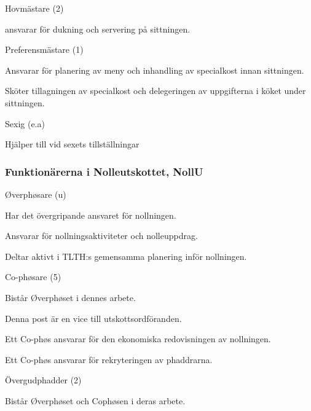 \documentclass[10pt]{article}
\begin{document}
\begin{emptylist}
    \item Hovmästare (2)
        \begin{dashlist}
        \item ansvarar för dukning och servering på sittningen.
        \end{dashlist}
    \item Preferensmästare (1)
        \begin{dashlist}
        \item Ansvarar för planering av meny och inhandling av specialkost innan sittningen.
        \item Sköter tillagningen av specialkost och delegeringen av uppgifterna i köket under sittningen.
        \end{dashlist}
    \item Sexig (e.a)
        \begin{dashlist}
        \item Hjälper till vid sexets tillställningar
        \end{dashlist}

\end{emptylist}
\subsubsection{Funktionärerna i Nolleutskottet, NollU}

\begin{emptylist}
    \item Øverphøsare (u)
        \begin{dashlist}
            \item Har det övergripande ansvaret för nollningen.
            \item Ansvarar för nollningsaktiviteter och nolleuppdrag.
            \item Deltar aktivt i TLTH:s gemensamma planering inför nollningen.
        \end{dashlist}
    \item Co-phøsare (5)
        \begin{dashlist}
          \item Bistår Øverphøset i dennes arbete.
          \item Denna post är en vice till utskottsordföranden.
          \item Ett Co-phøs ansvarar för den ekonomiska redovisningen av nollningen.
          \item Ett Co-phøs ansvarar för rekryteringen av phaddrarna.
        \end{dashlist}
    \item Övergudphadder (2)
        \begin{dashlist}
          \item Bistår Øverphøset och Cophøsen i deras arbete.
        \end{dashlist}
\end{emptylist}
\end{document}
